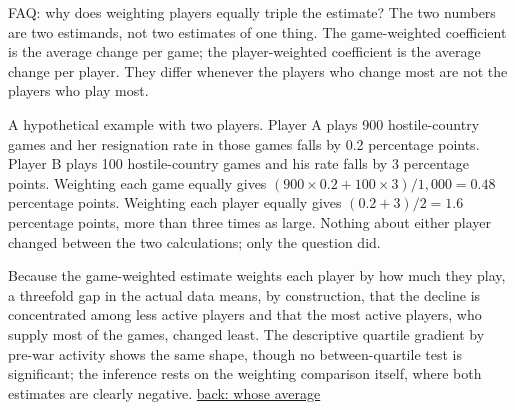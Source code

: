 \documentclass[aspectratio=169,11pt,t]{beamer}
\newcommand{\backto}[2]{\vfill\hfill\hyperlink{#1}{\textcolor{linkblue}{\scriptsize\textsf{back: #2}}}}
\begin{document}
\begin{frame}[label=faq-weighting]{FAQ: why does weighting players equally triple the estimate?}
  \footnotesize
  The two numbers are two estimands, not two estimates of one thing. The game-weighted coefficient is the average change per game; the player-weighted coefficient is the average change per player. They differ whenever the players who change most are not the players who play most.

  A hypothetical example with two players. Player A plays 900 hostile-country games and her resignation rate in those games falls by 0.2 percentage points. Player B plays 100 hostile-country games and his rate falls by 3 percentage points. Weighting each game equally gives $(900 \times 0.2 + 100 \times 3) / 1{,}000 = 0.48$ percentage points. Weighting each player equally gives $(0.2 + 3) / 2 = 1.6$ percentage points, more than three times as large. Nothing about either player changed between the two calculations; only the question did.

  Because the game-weighted estimate weights each player by how much they play, a threefold gap in the actual data means, by construction, that the decline is concentrated among less active players and that the most active players, who supply most of the games, changed least. The descriptive quartile gradient by pre-war activity shows the same shape, though no between-quartile test is significant; the inference rests on the weighting comparison itself, where both estimates are clearly negative.
  \backto{whoseaverage}{whose average}
\end{frame}
\end{document}
